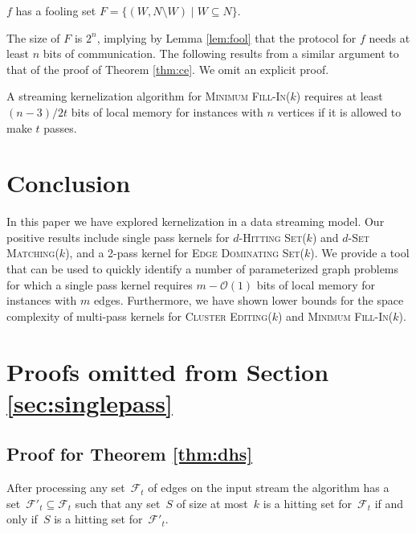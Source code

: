 \documentclass[draft,a4paper]{llncs}
\newcommand{\F}{\ensuremath{\mathcal{F}}\xspace}
\newcommand{\Oh}{\mathcal{O}}
\newcommand{\dHSk}{$d$-\textsc{Hitting Set($k$)}\xspace}
\newcommand{\dSMk}{$d$-\textsc{Set Matching($k$)}\xspace}
\newcommand{\EDSk}{\textsc{Edge Dominating Set($k$)}\xspace}
\newcommand{\CEk}{\textsc{Cluster Editing($k$)}\xspace}
\newcommand{\MFIk}{\textsc{Minimum Fill-In($k$)}\xspace}
\begin{document}
\begin{lemma} \label{lem:foolmfi}
 $f$ has a fooling set $F = \big\{(W, N \setminus W) \mid W \subseteq N \big\}$.
\end{lemma}

The size of $F$ is $2^n$, implying by Lemma \ref{lem:fool} that the protocol for $f$ needs at least $n$ bits of communication. The following results from a similar argument to that of the proof of Theorem \ref{thm:ce}. We omit an explicit proof.

\begin{theorem}
 A streaming kernelization algorithm for \MFIk requires at least $(n-3)/2t$ bits of local memory for instances with $n$ vertices if it is allowed to make $t$ passes.
\end{theorem}



\section{Conclusion} \label{sec:conc}
In this paper we have explored kernelization in a data streaming model. Our positive results include single pass kernels for \dHSk and \dSMk, and a 2-pass kernel for \EDSk. We provide a tool that can be used to quickly identify a number of parameterized graph problems for which a single pass kernel requires $m-\Oh(1)$ bits of local memory for instances with $m$ edges. Furthermore, we have shown lower bounds for the space complexity of multi-pass kernels for \CEk and \MFIk.






\newpage
\appendix
\section{Proofs omitted from Section \ref{sec:singlepass}}
\subsection{Proof for Theorem \ref{thm:dhs}}

\begin{lemma}\label{lem:dhs}
After processing any set~$\F_t$ of edges on the input stream the algorithm has a set~$\F'_t\subseteq \F_t$ such that any set~$S$ of size at most~$k$ is a hitting set for~$\F_t$ if and only if~$S$ is a hitting set for~$\F'_t$.
\end{lemma}
\end{document}
